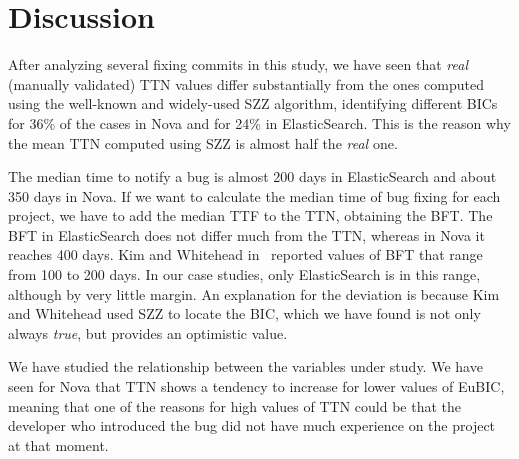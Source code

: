 \documentclass[10pt, conference]{IEEEtran}
\begin{document}
\section{Discussion}
\label{sec:discussion}
After analyzing several fixing commits in this study, we have seen that \emph{real} (manually validated) TTN values differ substantially from the ones computed using the well-known and widely-used SZZ algorithm, identifying different BICs for 36\% of the cases in Nova and for 24\% in ElasticSearch. This is the reason why the mean TTN computed using SZZ is almost half the \emph{real} one. %

The median time to notify a bug is almost 200 days in ElasticSearch and about 350 days in Nova. If we want to calculate the median time of bug fixing for each project, we have to add the median TTF to the TTN, obtaining the BFT. The BFT in ElasticSearch does not differ much from the TTN, whereas in Nova it reaches 400 days.
Kim and Whitehead in~\cite{kim2006long} reported values of BFT that range from 100 to 200 days. In our case studies, only ElasticSearch is in this range, although by very little margin. An explanation for the deviation is because Kim and Whitehead used SZZ to locate the BIC, which we have found is not only always \emph{true}, but provides an optimistic value.

\vspace{0.2cm}
\vspace{0.1cm}

We have studied the relationship between the variables under study. We have seen for Nova that TTN shows a tendency to increase for lower values of EuBIC, meaning that one of the reasons for high values of TTN could be that the developer who introduced the bug did not have much experience on the project at that moment.

\vspace{0.2cm}
\vspace{0.1cm}
\end{document}
